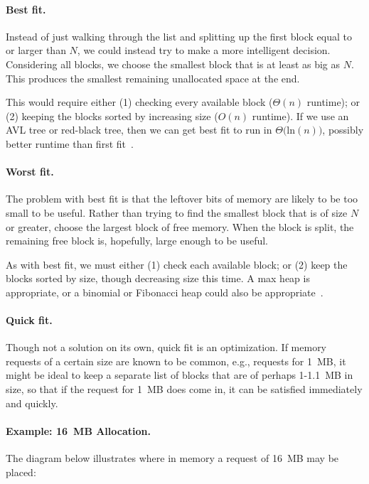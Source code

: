 \paragraph{Best fit.}
Instead of just walking through the list and splitting up the first block equal to or larger than $N$, we could instead try to make a more intelligent decision. Considering all blocks, we choose the smallest block that is at least as big as $N$. This produces the smallest remaining unallocated space at the end. 

This would require either (1) checking every available block ($\Theta(n)$ runtime); or (2) keeping the blocks sorted by increasing size ($O(n)$ runtime). If we use an AVL tree or red-black tree, then we can get best fit to run in $\Theta($ln$(n))$, possibly better runtime than first fit~\cite{mte241}.


\paragraph{Worst fit.}
The problem with best fit is that the leftover bits of memory are likely to be too small to be useful. Rather than trying to find the smallest block that is of size $N$ or greater, choose the largest block of free memory. When the block is split, the remaining free block is, hopefully, large enough to be useful. 

As with best fit, we must either (1) check each available block; or (2) keep the blocks sorted by size, though decreasing size this time. A max heap is appropriate, or a binomial or Fibonacci heap could also be appropriate~\cite{mte241}.

\paragraph{Quick fit.}
Though not a solution on its own, quick fit is an optimization. If memory requests of a certain size are known to be common, e.g., requests for 1~MB, it might be ideal to keep a separate list of blocks that are of perhaps 1-1.1~MB in size, so that if the request for 1~MB does come in, it can be satisfied immediately and quickly. 



\paragraph{Example: 16~MB Allocation.} The diagram below illustrates where in memory a request of 16~MB may be placed:

